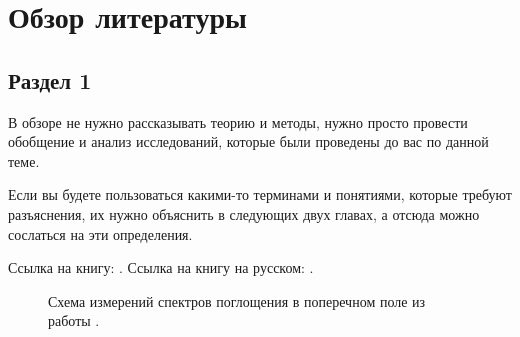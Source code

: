 \documentclass[a4paper,14pt]{extarticle}
\begin{document}
\section{Обзор литературы}

\subsection{Раздел 1}

В обзоре не нужно рассказывать теорию и методы, нужно просто провести обобщение и анализ исследований, которые были проведены до вас по данной теме.

Если вы будете пользоваться какими-то терминами и понятиями, которые требуют разъяснения, их нужно объяснить в следующих двух главах, а отсюда можно сослаться на эти определения.

Ссылка на книгу: \cite{datta1}.
Ссылка на книгу на русском: \cite{fedotkin1}.

\begin{figure}[ht]
    \begin{center}
    
    \caption{\label{fig:miller2-2}
        Схема измерений спектров поглощения в поперечном поле из работы \cite{miller1}.}
    \end {center}
    \end {figure}
    
\end{document}
